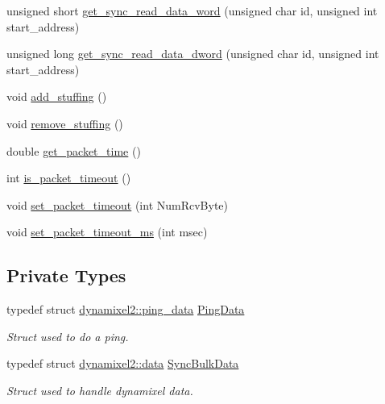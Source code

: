 \begin{DoxyCompactItemize}
\item 
unsigned short \hyperlink{classdynamixel2_a5afed0047167b1a4262d7fb961faa488}{get\+\_\+sync\+\_\+read\+\_\+data\+\_\+word} (unsigned char id, unsigned int start\+\_\+address)
\item 
unsigned long \hyperlink{classdynamixel2_a4f25408bacde5a8a3b00b2f7f79f0202}{get\+\_\+sync\+\_\+read\+\_\+data\+\_\+dword} (unsigned char id, unsigned int start\+\_\+address)
\item 
void \hyperlink{classdynamixel2_a350920b911d0ad2116b91f2149b840c7}{add\+\_\+stuffing} ()
\item 
void \hyperlink{classdynamixel2_a910c7b80ace3a816641468b32c0290a6}{remove\+\_\+stuffing} ()
\item 
double \hyperlink{classdynamixel2_a7d4d98424dc85511970e9a405b919594}{get\+\_\+packet\+\_\+time} ()
\item 
int \hyperlink{classdynamixel2_a4c996c0d9edcfd320906674512837a9e}{is\+\_\+packet\+\_\+timeout} ()
\item 
void \hyperlink{classdynamixel2_a132d723a321ba225f75f2c79e5d4d27b}{set\+\_\+packet\+\_\+timeout} (int Num\+Rcv\+Byte)
\item 
void \hyperlink{classdynamixel2_a7d85d44aa6c1fe51f952f395a79296d5}{set\+\_\+packet\+\_\+timeout\+\_\+ms} (int msec)
\end{DoxyCompactItemize}
\subsection*{Private Types}
\begin{DoxyCompactItemize}
\item 
typedef struct \hyperlink{structdynamixel2_1_1ping__data}{dynamixel2\+::ping\+\_\+data} \hyperlink{classdynamixel2_a0ca8255cb0a7a1584c9638d83196c7ae}{Ping\+Data}
\begin{DoxyCompactList}\small\item\em Struct used to do a ping. \end{DoxyCompactList}\item 
typedef struct \hyperlink{structdynamixel2_1_1data}{dynamixel2\+::data} \hyperlink{classdynamixel2_a7d3321dea922094901dd5b5afe31bb60}{Sync\+Bulk\+Data}
\begin{DoxyCompactList}\small\item\em Struct used to handle dynamixel data. \end{DoxyCompactList}\end{DoxyCompactItemize}
